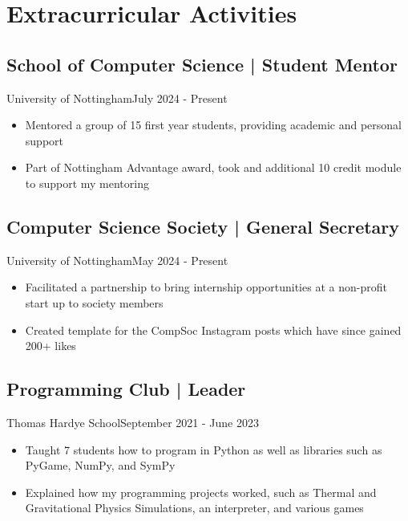 \section{Extracurricular Activities}
\subsection{School of Computer Science | Student Mentor}{University of Nottingham}{July 2024 - Present}
\begin{itemize}
    \item Mentored a group of 15 first year students, providing academic and personal support
    \item Part of Nottingham Advantage award, took and additional 10 credit module to support my mentoring
\end{itemize}
\subsection{Computer Science Society | General Secretary}{University of Nottingham}{May 2024 - Present}
\begin{itemize}
    \item Facilitated a partnership to bring internship opportunities at a non-profit start up to society members
    \item Created template for the CompSoc Instagram posts which have since gained 200+ likes
\end{itemize}
\subsection{Programming Club | Leader}{Thomas Hardye School}{September 2021 - June 2023}
\begin{itemize}
    \item Taught 7 students how to program in Python as well as libraries such as PyGame, NumPy, and SymPy
    \item Explained how my programming projects worked, such as Thermal and Gravitational Physics Simulations, an interpreter, and various games
\end{itemize}
\vspace{.3em}
